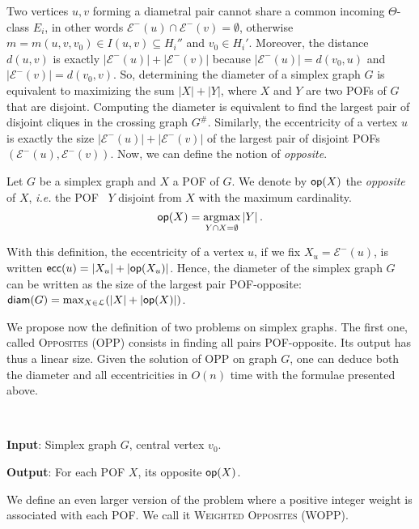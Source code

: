 \documentclass[a4paper,UKenglish,numberwithinsect,cleveref, autoref,anonymous]{lipics-v2021}
\DeclareMathOperator*{\argmax}{argmax}
\newcommand{\card}[1]{\left| #1 \right|}
\newcommand{\diam}{\mbox{\textsf{diam}}}
\newcommand{\ecc}{\mbox{\textsf{ecc}}}
\newcommand{\opp}{\mbox{\textsf{op}}}
\begin{document}
Two vertices $u,v$ forming a diametral pair cannot share a common incoming $\Theta$-class $E_i$, in other words $\mathcal{E}^-(u) \cap \mathcal{E}^-(v) = \emptyset$, otherwise $m = m(u,v,v_0) \in I(u,v) \subseteq H_i''$ and $v_0 \in H_i'$. Moreover, the distance $d(u,v)$ is exactly $\card{\mathcal{E}^-(u)} + \card{\mathcal{E}^-(v)}$ because $\card{\mathcal{E}^-(u)} = d(v_0,u)$ and $\card{\mathcal{E}^-(v)} = d(v_0,v)$. So, determining the diameter of a simplex graph $G$ is equivalent to maximizing the sum $\card{X} + \card{Y}$, where $X$ and $Y$ are two POFs of $G$ that are disjoint. Computing the diameter is equivalent to find the largest pair of disjoint cliques in the crossing graph $G^{\#}$. Similarly, the eccentricity of a vertex $u$ is exactly the size $\card{\mathcal{E}^-(u)} + \card{\mathcal{E}^-(v)}$ of the largest pair of disjoint POFs $(\mathcal{E}^-(u),\mathcal{E}^-(v))$.
Now, we can define the notion of \textit{opposite}.

\begin{definition}
Let $G$ be a simplex graph and $X$ a POF of $G$. We denote by $\opp(X)$ the \textit{opposite} of $X$, {\em i.e.} the POF~ $Y$ disjoint from $X$ with the maximum cardinality.
\[
\opp(X) = \argmax_{Y \cap X = \emptyset} \card{Y}.
\]
\label{def:opposite}
\end{definition}

With this definition, the eccentricity of a vertex $u$, if we fix $X_u = \mathcal{E}^-(u)$, is written $\ecc(u) = \card{X_u} + \card{\opp(X_u)}$. Hence, the diameter of the simplex graph $G$ can be written as the size of the largest pair POF-opposite: $\diam(G) = \max_{X\in \mathcal{L}}( \card{X} + \card{\opp(X)})$.

We propose now the definition of two problems on simplex graphs. The first one, called \textsc{Opposites} (OPP) consists in finding all pairs POF-opposite. Its output has thus a linear size. Given the solution of OPP on graph $G$, one can deduce both the diameter and all eccentricities in $O(n)$ time with the formulae presented above.

\begin{definition}[OPP]~

\textbf{Input}: Simplex graph $G$, central vertex $v_0$.

\textbf{Output}: For each POF $X$, its opposite $\opp(X)$.
\label{def:dpp}
\end{definition}

We define an even larger version of the problem where a positive integer weight is associated with each POF. We call it \textsc{Weighted Opposites} (WOPP).
\end{document}
